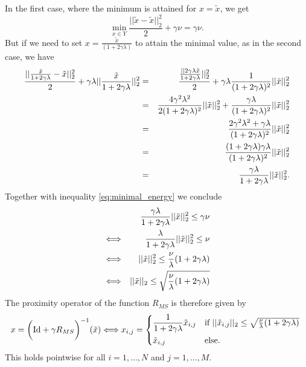         In the first case, where the minimum is attained for $x = \tilde{x}$, we get
            $$
                \min_{x \in Y} \frac{||\tilde{x} - \tilde{x}||_{2}^{2}}{2} + \gamma\nu = \gamma \nu.
            $$
        But if we need to set $x = \frac{\tilde{x}}{(1 + 2\gamma \lambda)}$ to attain the minimal value, as in the second case, we have
            \begin{eqnarray}
                \frac{||\frac{\tilde{x}}{1 + 2\gamma\lambda} - \tilde{x}||_{2}^{2}}{2} + \gamma \lambda ||\frac{\tilde{x}}{1 + 2\gamma\lambda}||_{2}^{2} &=& \frac{\frac{||2\gamma\lambda \tilde{x}}{1 + 2\gamma\lambda}||_{2}^{2}}{2} + \gamma\lambda \frac{1}{(1 + 2\gamma\lambda)^{2}}||\tilde{x}||_{2}^{2} \notag \\
                &=& \frac{4\gamma^{2}\lambda^{2}}{2(1 + 2\gamma\lambda)^{2}} ||\tilde{x}||_{2}^{2} + \frac{\gamma\lambda}{(1 + 2\gamma\lambda)^{2}} ||\tilde{x}||_{2}^{2} \notag \\
                &=& \frac{2\gamma^{2}\lambda^{2} + \gamma\lambda}{(1 + 2\gamma\lambda)^{2}} ||\tilde{x}||_{2}^{2} \notag \\
                &=& \frac{(1 + 2\gamma\lambda)\gamma\lambda}{(1 + 2\gamma\lambda)^{2}} ||\tilde{x}||_{2}^{2} \notag \\
                &=& \frac{\gamma\lambda}{1 + 2\gamma\lambda} ||\tilde{x}||_{2}^{2}. \label{eq:bound_on_p}
            \end{eqnarray}
        Together with inequality \ref{eq:minimal_energy} we conclude
            \begin{eqnarray}
                && \frac{\gamma\lambda}{1 + 2\gamma\lambda} ||\tilde{x}||_{2}^{2} \le \gamma\nu \notag \\
                &\Longleftrightarrow& \frac{\lambda}{1 + 2\gamma\lambda} ||\tilde{x}||_{2}^{2} \le \nu \notag \\
                &\Longleftrightarrow& ||\tilde{x}||_{2}^{2} \le \frac{\nu}{\lambda}(1 + 2\gamma\lambda) \notag \\
                &\Longleftrightarrow& ||\tilde{x}||_{2} \le \sqrt{\frac{\nu}{\lambda}(1 + 2\gamma\lambda)} \label{eq:constraint_R}
            \end{eqnarray}
        The proximity operator of the function $R_{MS}$ is therefore given by
            \begin{equation}
                x = \bigg( \textnormal{Id} + \gamma R_{MS} \bigg)^{-1}(\tilde{x}) \Longleftrightarrow x_{i,j} =
                \begin{dcases*}
                    \frac{1}{1 + 2\gamma\lambda}\tilde{x}_{i,j} & \textnormal{if $||\tilde{x}_{i,j}||_{2} \le \sqrt{\frac{\nu}{\lambda}(1 + 2\gamma\lambda)}$} \\
                    \tilde{x}_{i,j} & \textnormal{else.}
                \end{dcases*}
                \label{eq:proximity_operator_R}
            \end{equation}
        This holds pointwise for all $i = 1, ..., N$ and $j = 1, ..., M$.

